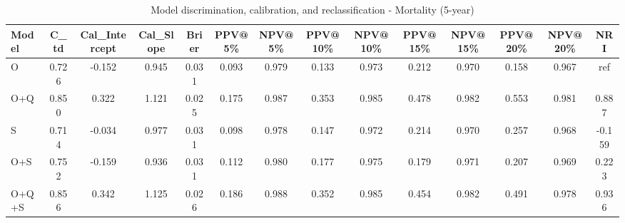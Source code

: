 \begin{table}[htbp]
\centering
\small
\caption{Model discrimination, calibration, and reclassification - Mortality (5-year)}
\label{tab:perf_mortality_5y}
\begin{tabular}{lccccccccccccc}
\toprule
Model & C\_td & Cal\_Intercept & Cal\_Slope & Brier & PPV@5\% & NPV@5\% & PPV@10\% & NPV@10\% & PPV@15\% & NPV@15\% & PPV@20\% & NPV@20\% & NRI \\
\midrule
O & 0.726 & -0.152 & 0.945 & 0.031 & 0.093 & 0.979 & 0.133 & 0.973 & 0.212 & 0.970 & 0.158 & 0.967 & ref \\
O+Q & 0.850 & 0.322 & 1.121 & 0.025 & 0.175 & 0.987 & 0.353 & 0.985 & 0.478 & 0.982 & 0.553 & 0.981 & 0.887 \\
S & 0.714 & -0.034 & 0.977 & 0.031 & 0.098 & 0.978 & 0.147 & 0.972 & 0.214 & 0.970 & 0.257 & 0.968 & -0.159 \\
O+S & 0.752 & -0.159 & 0.936 & 0.031 & 0.112 & 0.980 & 0.177 & 0.975 & 0.179 & 0.971 & 0.207 & 0.969 & 0.223 \\
O+Q+S & 0.856 & 0.342 & 1.125 & 0.026 & 0.186 & 0.988 & 0.352 & 0.985 & 0.454 & 0.982 & 0.491 & 0.978 & 0.936 \\
\bottomrule
\end{tabular}
\end{table}